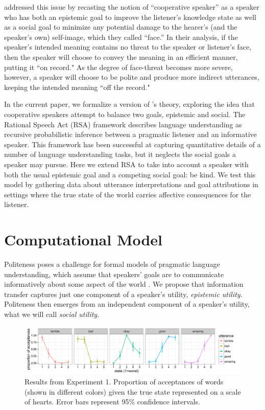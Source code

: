\documentclass[10pt,letterpaper]{article}
\begin{document}
 addressed this issue by recasting the notion of ``cooperative speaker'' as a speaker
who has both an epistemic goal to improve the listener's knowledge state as well as a social goal to minimize any potential damage to the hearer's (and the speaker's own) self-image, which they called ``face.''
In their analysis, if the speaker's intended meaning contains no threat to the speaker or listener's face,
then the speaker will choose to convey the meaning in an efficient manner, putting it ``on record."
As the degree of face-threat becomes more severe, however,
a speaker will choose to be polite and produce more indirect utterances, keeping the intended meaning ``off the record."

In the current paper, we formalize a version of 's theory, exploring the idea that cooperative speakers attempt to balance two goals, epistemic and social.
The Rational Speech Act (RSA) framework \cite{Frank2012, Goodman2013} describes language understanding as recursive probabilistic inference between a pragmatic listener and an informative speaker. This framework has been successful at capturing quantitative details of a number of language understanding tasks, but it neglects the social goals a speaker may pursue.
Here we extend RSA to take into account a speaker with both the usual epistemic goal and a competing social goal: be kind.
We test this model by gathering data about utterance interpretations and goal attributions in settings where the true state of the world carries affective consequences for the listener.


\section{Computational Model}

Politeness poses a challenge for formal models of pragmatic language understanding, which assume that speakers' goals are to communicate informatively about some aspect of the world \cite{Frank2012, Goodman2013}.
We propose that information transfer captures just one component of a speaker's utility, \emph{epistemic utility}.
Politeness then emerges from an independent component of a speaker's utility, what we will call \emph{social utility}.


\begin{figure}[!b]
\begin{center}
  \includegraphics[width=.9\textwidth]{figures/exp1.pdf}
  \caption{\label{fig:exp1} Results from Experiment 1. Proportion of acceptances of words (shown in different colors) given the true state represented on a scale of hearts. Error bars represent 95\% confidence intervals.}
  \end{center}
\end{figure}
\end{document}
